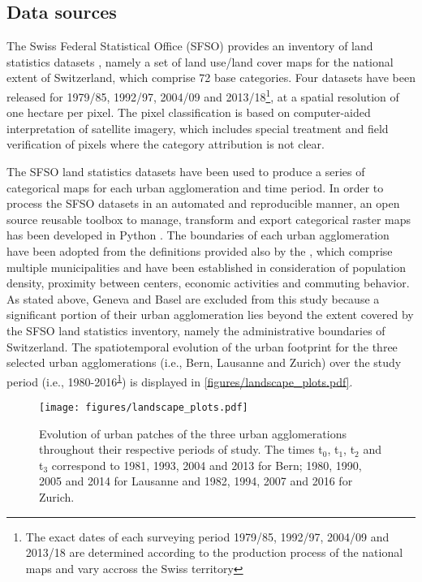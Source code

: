 \subsection*{Data sources}

The Swiss Federal Statistical Office (SFSO) provides an inventory of land statistics datasets , namely a set of land use/land cover maps for the national extent of Switzerland, which comprise 72 base categories. Four datasets have been released for 1979/85, 1992/97, 2004/09 and 2013/18\footnote{\label{fn:years}The exact dates of each surveying period 1979/85, 1992/97, 2004/09 and 2013/18 are determined according to the production process of the national maps and vary accross the Swiss territory }, at a spatial resolution of one hectare per pixel.
The pixel classification is based on computer-aided interpretation of satellite imagery, which includes special treatment and field verification of pixels where the category attribution is not clear.

The SFSO land statistics datasets have been used to produce a series of categorical maps for each urban agglomeration and time period.
In order to process the SFSO datasets in an automated and reproducible manner, an open source reusable toolbox to manage, transform and export categorical raster maps has been developed in Python \citep{bosch2019swisslandstats}.
The boundaries of each urban agglomeration have been adopted from the definitions provided also by the , which comprise multiple municipalities and have been established in consideration of population density, proximity between centers, economic activities and commuting behavior.
As stated above, Geneva and Basel are excluded from this study because a significant portion of their urban agglomeration lies beyond the extent covered by the SFSO land statistics inventory, namely the administrative boundaries of Switzerland.
The spatiotemporal evolution of the urban footprint for the three selected urban agglomerations (i.e., Bern, Lausanne and Zurich) over the study period (i.e., 1980-2016\textsuperscript{\ref{fn:years}}) is displayed in \autoref{figures/landscape_plots.pdf}.

\begin{figure}[!ht]
  \begin{adjustwidth}{0cm}{-.4\textwidth}
    \centering  
    \texttt{[image: figures/landscape\_plots.pdf]}
    \caption[Evolution of urban patches]{\label{figures/landscape_plots.pdf}Evolution of urban patches of the three urban agglomerations throughout their respective periods of study. The times t$_0$, t$_1$, t$_2$ and t$_3$ correspond to 1981, 1993, 2004 and 2013 for Bern; 1980, 1990, 2005 and 2014 for Lausanne and 1982, 1994, 2007 and 2016 for Zurich.}
  \end{adjustwidth}
\end{figure}


